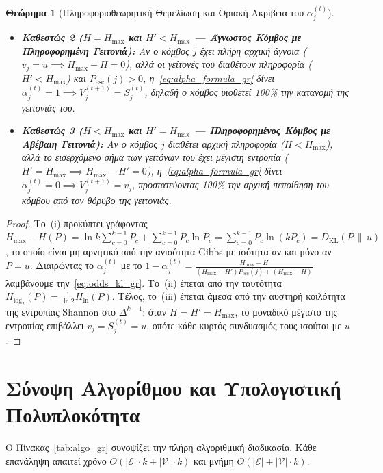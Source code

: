 \documentclass[11pt, a4paper]{article}
\newtheorem{theorem}{Θεώρημα}
\theoremstyle{definition}
\theoremstyle{definition}
\begin{document}
\begin{theorem}[Πληροφοριοθεωρητική Θεμελίωση και Οριακή Ακρίβεια του $\alpha_j^{(t)}$]
\begin{enumerate}[label=(\roman*)]
\begin{itemize}
\item \textbf{Καθεστώς 2 ($H = H_{\max}$ και $H' < H_{\max}$ --- Άγνωστος Κόμβος με Πληροφορημένη Γειτονιά):} Αν ο κόμβος $j$ έχει πλήρη αρχική άγνοια ($v_j = u \implies H_{\max} - H = 0$), αλλά οι γείτονές του διαθέτουν πληροφορία ($H' < H_{\max}$) και $P_{\mathrm{esc}}(j) > 0$, η~\eqref{eq:alpha_formula_gr} δίνει $\alpha_j^{(t)} = 1 \implies V_j^{(t+1)} = S_j^{(t)}$, δηλαδή ο κόμβος υιοθετεί 100\% την κατανομή της γειτονιάς του.
\item \textbf{Καθεστώς 3 ($H < H_{\max}$ και $H' = H_{\max}$ --- Πληροφορημένος Κόμβος με Αβέβαιη Γειτονιά):} Αν ο κόμβος $j$ διαθέτει αρχική πληροφορία ($H < H_{\max}$), αλλά το εισερχόμενο σήμα των γειτόνων του έχει μέγιστη εντροπία ($H' = H_{\max} \implies H_{\max} - H' = 0$), η~\eqref{eq:alpha_formula_gr} δίνει $\alpha_j^{(t)} = 0 \implies V_j^{(t+1)} = v_j$, προστατεύοντας 100\% την αρχική πεποίθηση του κόμβου από τον θόρυβο της γειτονιάς.
\end{itemize}
\end{enumerate}
\end{theorem}

\begin{proof}
Το~(i) προκύπτει γράφοντας $H_{\max} - H(P) = \ln k \sum_{c=0}^{k-1} P_c + \sum_{c=0}^{k-1} P_c \ln P_c = \sum_{c=0}^{k-1} P_c \ln(k P_c) = D_{\mathrm{KL}}(P \,\|\, u)$, το οποίο είναι μη-αρνητικό από την ανισότητα Gibbs με ισότητα αν και μόνο αν $P = u$. Διαιρώντας το $\alpha_j^{(t)}$ με το $1 - \alpha_j^{(t)} = \frac{H_{\max} - H}{(H_{\max} - H')P_{\mathrm{esc}}(j) + (H_{\max} - H)}$ λαμβάνουμε την~\eqref{eq:odds_kl_gr}. Το~(ii) έπεται από την ταυτότητα $H_{\log_2}(P) = \frac{1}{\ln 2} H_{\ln}(P)$. Τέλος, το~(iii) έπεται άμεσα από την αυστηρή κοιλότητα της εντροπίας Shannon στο $\Delta^{k-1}$: όταν $H = H' = H_{\max}$, το μοναδικό μέγιστο της εντροπίας επιβάλλει $v_j = S_j^{(t)} = u$, οπότε κάθε κυρτός συνδυασμός τους ισούται με $u$.
\end{proof}

\section{Σύνοψη Αλγορίθμου και Υπολογιστική Πολυπλοκότητα}

Ο Πίνακας~\ref{tab:algo_gr} συνοψίζει την πλήρη αλγοριθμική διαδικασία. Κάθε επανάληψη απαιτεί χρόνο $O(|\mathcal{E}|\cdot k + |\mathcal{V}|\cdot k)$ και μνήμη $O(|\mathcal{E}| + |\mathcal{V}|\cdot k)$.
\end{document}

